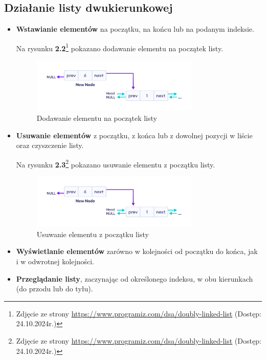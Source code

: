 \newpage
\subsection{Działanie listy dwukierunkowej}
\begin{itemize}
  \item \textbf{Wstawianie elementów} na początku, na końcu lub na podanym indeksie.

        Na rysunku \textbf{2.2}\footnote{Zdjęcie ze strony \url{https://www.programiz.com/dsa/doubly-linked-list}\cite{Programiz} (Dostęp: 24.10.2024r.)} pokazano dodawanie elementu na początek listy.

        \begin{figure}[!htb]
          \begin{center}
            \includegraphics[width=8cm]{rys/dodawanie-elementu.png}
            \caption{Dodawanie elementu na początek listy}\label{rys:dodawanie_elementu}
          \end{center}
        \end{figure}

  \item \textbf{Usuwanie elementów} z początku, z końca lub z dowolnej pozycji w liście oraz czyszczenie listy.

        Na rysunku \textbf{2.3}\footnote{Zdjęcie ze strony \url{https://www.programiz.com/dsa/doubly-linked-list}\cite{Programiz} (Dostęp: 24.10.2024r.)} pokazano usuwanie elementu z początku listy.

        \begin{figure}[!htb]
          \begin{center}
            \includegraphics[width=8cm]{rys/dodawanie-elementu.png}
            \caption{Usuwanie elementu z początku listy}\label{rys:usuwanie_elementu}
          \end{center}
        \end{figure}

  \item \textbf{Wyświetlanie elementów} zarówno w kolejności od początku do końca, jak i w odwrotnej kolejności.

  \item \textbf{Przeglądanie listy}, zaczynając od określonego indeksu, w obu kierunkach (do przodu lub do tyłu).
\end{itemize}

